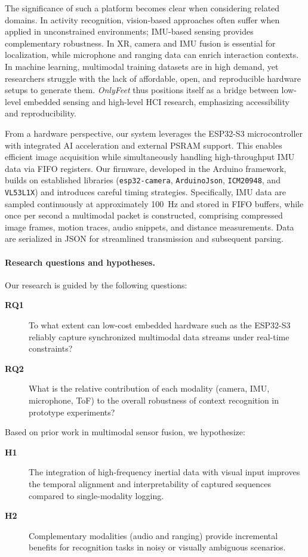 \documentclass[manuscript,review,anonymous]{acmart}
\begin{document}
The significance of such a platform becomes clear when considering related domains. In activity recognition, vision-based approaches often suffer when applied in unconstrained environments; IMU-based sensing provides complementary robustness. In XR, camera and IMU fusion is essential for localization, while microphone and ranging data can enrich interaction contexts. In machine learning, multimodal training datasets are in high demand, yet researchers struggle with the lack of affordable, open, and reproducible hardware setups to generate them. \textit{OnlyFeet} thus positions itself as a bridge between low-level embedded sensing and high-level HCI research, emphasizing accessibility and reproducibility.

From a hardware perspective, our system leverages the ESP32-S3 microcontroller with integrated AI acceleration and external PSRAM support. This enables efficient image acquisition while simultaneously handling high-throughput IMU data via FIFO registers. Our firmware, developed in the Arduino framework, builds on established libraries (\texttt{esp32-camera}, \texttt{ArduinoJson}, \texttt{ICM20948}, and \texttt{VL53L1X}) and introduces careful timing strategies. Specifically, IMU data are sampled continuously at approximately 100~Hz and stored in FIFO buffers, while once per second a multimodal packet is constructed, comprising compressed image frames, motion traces, audio snippets, and distance measurements. Data are serialized in JSON for streamlined transmission and subsequent parsing.

\paragraph*{Research questions and hypotheses.}
Our research is guided by the following questions:
\begin{description}
  \item[\textbf{RQ1}] To what extent can low-cost embedded hardware such as the ESP32-S3 reliably capture synchronized multimodal data streams under real-time constraints?
  \item[\textbf{RQ2}] What is the relative contribution of each modality (camera, IMU, microphone, ToF) to the overall robustness of context recognition in prototype experiments?
\end{description}

Based on prior work in multimodal sensor fusion, we hypothesize:
\begin{description}
  \item[\textbf{H1}] The integration of high-frequency inertial data with visual input improves the temporal alignment and interpretability of captured sequences compared to single-modality logging.
  \item[\textbf{H2}] Complementary modalities (audio and ranging) provide incremental benefits for recognition tasks in noisy or visually ambiguous scenarios.
\end{description}
\end{document}
